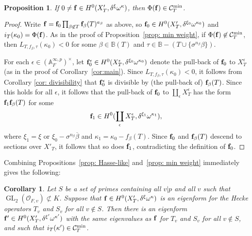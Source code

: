 \documentclass[11pt,pdflatex]{amsart}
\theoremstyle{plain}
\theoremstyle{definition}
\newcommand{\CO}{\mathcal{O}}
\theoremstyle{plain}
\newtheorem{prop}[theorem]{Proposition}
\newtheorem{cor}[theorem]{Corollary}
\theoremstyle{definition}
\theoremstyle{remark}
\numberwithin{equation}{section}
\numberwithin{figure}{section} \numberwithin{table}{subsection}
\newcommand{\GL}{{\operatorname{GL}}}
\newcommand{\calC}{{\mathcal{C}}}
\def\AA{\mathbb{A}}
\def\BB{\mathbb{B}}
\begin{document}
\begin{prop} \label{prop: min weight'} If $0 \neq {\bf f} \in H^0(X'_T,\delta^\xi\omega^\kappa)$, then $\Phi({\bf f}) \in \calC^{\rm min}_T$.
\end{prop}
 \begin{proof} Write ${\bf f}={\bf f}_0\prod_{\beta \not\in T} {\bf f}_\beta(T)^{a_\beta}$ as above, so ${\bf f}_0 \in H^0(X'_T,\delta^{\xi_0}\omega^{\kappa_0})$ and $i_T(\kappa_0)=\Phi({\bf f})$.  As in the proof of Proposition~\ref{prop: min weight}, if $\Phi({\bf f})\not \in \calC^{\rm min}_T$, then $L_{T,f_\beta,\tau}(\kappa_0)<0$ for some $\beta \in \BB(T)$ and  $\tau \in \BB-(T \cup\{\sigma^{n_\beta}\beta\})$.

For each $\epsilon \in (\AA_F^{\infty,p})^\times$, let ${\bf f}_0^\epsilon \in H^0(X^\epsilon_T, \delta^{\xi_0}\omega^{\kappa_0})$ denote the pull-back of ${\bf f}_0$ to $X_T^\epsilon$ (as in the proof of Corollary~\ref{cor:main}).  Since $L_{T,f_\beta,\tau}(\kappa_0)<0$, it follows from Corollary \ref{cor: divisibility} that ${\bf f}_0^\epsilon$ is divisible by (the pull-back of) ${\bf f}_\beta(T)$. Since this holds for all $\epsilon$, it follows that the pull-back of ${\bf f}_0$ to $\coprod_\epsilon X_T^\epsilon$ has the form ${\bf f}_1{\bf f}_\beta(T)$ for some 
$${\bf f}_1 \in H^0(\coprod_\epsilon X^\epsilon_T, \delta^{\xi_1}\omega^{\kappa_1}),$$
where $\xi_1 = \xi$ or $\xi_0 - \sigma^{n_\beta}\overline{\beta}$ and $\kappa_1 = \kappa_0 - f_\beta(T)$.  Since ${\bf f}_0$ and ${\bf f}_\beta(T)$ descend to sections over $X'_T$, it follows that so does ${\bf f}_1$, contradicting the definition of ${\bf f}_0$.
 \end{proof}

Combining Propositions~\ref{prop: Hasse-like} and~\ref{prop: min weight} immediately gives the following:
\begin{cor} Let $S$ be a set of primes containing all $v|p$ and all $v$ such that $\GL_2(\CO_{F,v}) \not\subset K$.  Suppose that ${\bf f} \in H^0(X'_T,\delta^\xi\omega^\kappa)$ is an eigenform for the Hecke operators $T_v$ and $S_v$ for all $v \not\in S$. Then there is an eigenform ${\bf f}' \in H^0(X'_T,\delta^{\xi'}\omega^{\kappa'})$ with the same eigenvalues as ${\bf f}$ for $T_v$ and $S_v$ for all $v\not\in S$, and such that
$i_T(\kappa') \in \calC^{\rm min}_T$.
\end{cor}


 
\end{document}
